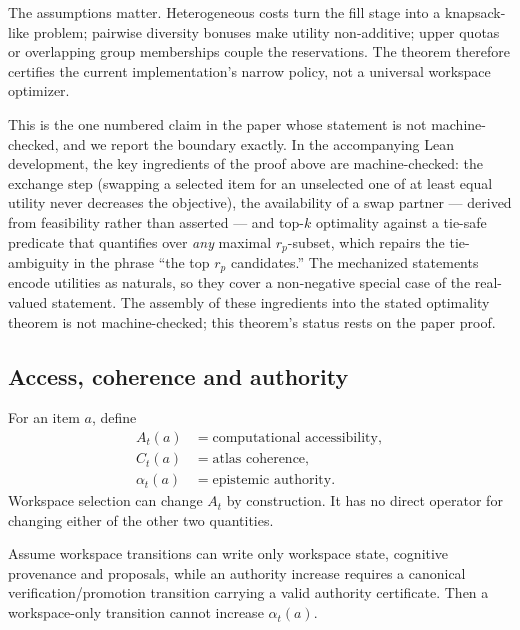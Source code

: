 The assumptions matter. Heterogeneous costs turn the fill stage into a knapsack-like problem; pairwise diversity bonuses make utility non-additive; upper quotas or overlapping group memberships couple the reservations. The theorem therefore certifies the current implementation's narrow policy, not a universal workspace optimizer.

\begin{remark}
This is the one numbered claim in the paper whose statement is not machine-checked, and we report the boundary exactly. In the accompanying Lean development, the key ingredients of the proof above are machine-checked: the exchange step (swapping a selected item for an unselected one of at least equal utility never decreases the objective), the availability of a swap partner --- derived from feasibility rather than asserted --- and top-$k$ optimality against a tie-safe predicate that quantifies over \emph{any} maximal $r_p$-subset, which repairs the tie-ambiguity in the phrase ``the top $r_p$ candidates.'' The mechanized statements encode utilities as naturals, so they cover a non-negative special case of the real-valued statement. The assembly of these ingredients into the stated optimality theorem is not machine-checked; this theorem's status rests on the paper proof.
\end{remark}

\subsection{Access, coherence and authority}

For an item \(a\), define
\[
\begin{aligned}
A_t(a)&=\text{computational accessibility},\\
C_t(a)&=\text{atlas coherence},\\
\alpha_t(a)&=\text{epistemic authority}.
\end{aligned}
\]
Workspace selection can change \(A_t\) by construction. It has no direct operator for changing either of the other two quantities.

\begin{proposition}
Assume workspace transitions can write only workspace state, cognitive provenance and proposals, while an authority increase requires a canonical verification/promotion transition carrying a valid authority certificate. Then a workspace-only transition cannot increase \(\alpha_t(a)\).
\end{proposition}


